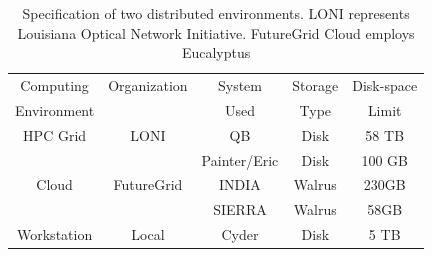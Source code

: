 \documentclass{cpeauth}
\begin{document}

\begin{table}
\small
\begin{tabular}{|c|c|c|c|c|} 
\hline 
Computing & Organization & System &  Storage & Disk-space  \\
Environment & & Used & Type  &  Limit \\ \hline
HPC Grid & LONI & QB & Disk & 58 TB   \\
 &  &  Painter/Eric  & Disk &  100 GB  \\
Cloud & FutureGrid & INDIA & Walrus & 230GB \\
         &                    &  SIERRA & Walrus & 58GB \\ 
Workstation &  Local   &  Cyder & Disk       & 5 TB\\

 \hline


 \end{tabular}
 \caption{Specification of two distributed environments. LONI represents Louisiana Optical Network Initiative\cite{loni}. FutureGrid Cloud\cite{futuregrid} employs Eucalyptus}
\label{table:two-systems} 
\end{table}


\end{document}
